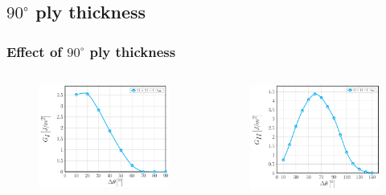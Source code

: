 \documentclass[first,firstsupp,lastsupp,last,hyperref,table]{ETHclass}
\begin{document}
\subsection{$90^{\circ}$ ply thickness}

\begin{frame}
\frametitle{\vspace{0.2cm}\small Effect of $90^{\circ}$ ply thickness}
\vspace{-.75cm}
\centering
\begin{columns}[c]
\centering
\begin{column}{0.5\textwidth}
\centering
\begin{figure}
\centering
\includegraphics[width=\columnwidth]{nxk-1-vf60-GI-thick.pdf}
\end{figure}
\end{column}
\begin{column}{0.5\textwidth}
\centering
\begin{figure}
\centering
\includegraphics[width=\columnwidth]{nxk-1-vf60-GII-thick.pdf}

\end{figure}
\end{column}
\end{columns}
\end{frame}
\end{document}
